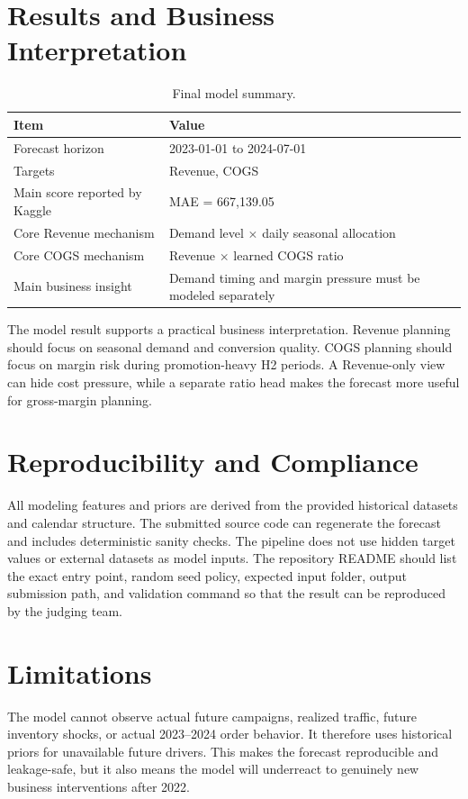 \documentclass{article}
\begin{document}
\section{Results and Business Interpretation}

\begin{table}[h]
\centering
\caption{Final model summary.}
\label{tab:model_summary}
\begin{tabular}{ll}
\toprule
Item & Value \\
\midrule
Forecast horizon & 2023-01-01 to 2024-07-01 \\
Targets & Revenue, COGS \\
Main score reported by Kaggle & MAE = 667,139.05 \\
Core Revenue mechanism & Demand level $\times$ daily seasonal allocation \\
Core COGS mechanism & Revenue $\times$ learned COGS ratio \\
Main business insight & Demand timing and margin pressure must be modeled separately \\
\bottomrule
\end{tabular}
\end{table}

The model result supports a practical business interpretation. Revenue planning should focus on seasonal demand and conversion quality. COGS planning should focus on margin risk during promotion-heavy H2 periods. A Revenue-only view can hide cost pressure, while a separate ratio head makes the forecast more useful for gross-margin planning.

\section{Reproducibility and Compliance}

All modeling features and priors are derived from the provided historical datasets and calendar structure. The submitted source code can regenerate the forecast and includes deterministic sanity checks. The pipeline does not use hidden target values or external datasets as model inputs. The repository README should list the exact entry point, random seed policy, expected input folder, output submission path, and validation command so that the result can be reproduced by the judging team.

\section{Limitations}

The model cannot observe actual future campaigns, realized traffic, future inventory shocks, or actual 2023--2024 order behavior. It therefore uses historical priors for unavailable future drivers. This makes the forecast reproducible and leakage-safe, but it also means the model will underreact to genuinely new business interventions after 2022.
\end{document}

